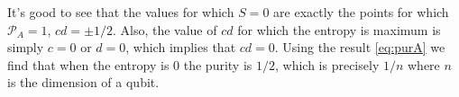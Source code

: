 \documentclass{_mypackages/monograph}
\begin{document}
It's good to see that the values for which \(S=0\) are exactly the points for which  \(\mathcal{P}_A=1\), \(cd=\pm1/2\). Also, the value of \(cd\) for which the entropy is maximum is simply \(c=0\) or \(d=0\), which implies that \(cd=0\). Using the result \eqref{eq:purA} we find that when the entropy is \(0\) the purity is \(1/2\), which is precisely \(1/n\) where \(n\) is the dimension of a qubit.
\end{document}
